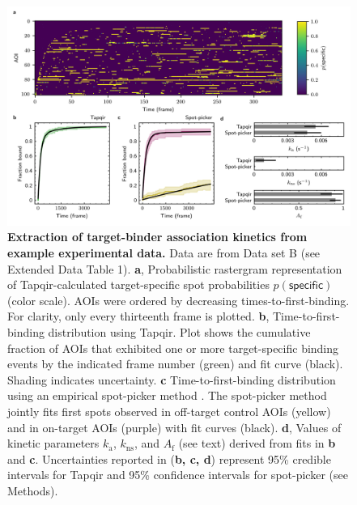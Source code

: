 \begin{figure}[h]
\centering
\includegraphics[width=\textwidth]{figures/figure7.png}
\caption{\textbf{Extraction of target-binder association kinetics from example experimental data.} Data are from Data set B (see Extended Data Table 1).  \textbf{a}, Probabilistic rastergram representation of Tapqir-calculated target-specific spot  probabilities $p(\mathsf{specific})$ (color scale). AOIs were ordered by decreasing times-to-first-binding. For clarity, only every thirteenth frame is plotted. \textbf{b}, Time-to-first-binding distribution using Tapqir. Plot shows the cumulative fraction of AOIs that exhibited one or more target-specific binding events by the indicated frame number (green) and fit curve (black). Shading indicates uncertainty. \textbf{c} Time-to-first-binding distribution using an empirical spot-picker method \cite{Friedman2013-sf}. The spot-picker method jointly fits first spots observed in off-target control AOIs (yellow) and in on-target AOIs (purple) with fit curves (black). \textbf{d}, Values of kinetic parameters  $k_\mathrm{a}$, $k_\mathrm{ns}$, and $A_\mathrm{f}$ (see text) derived from fits in \textbf{b} and \textbf{c}. Uncertainties reported in (\textbf{b, c, d}) represent 95\% credible intervals for Tapqir and 95\% confidence intervals for spot-picker (see Methods).
}
\label{fig:experimental_data}
\end{figure}
